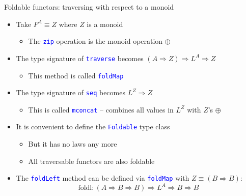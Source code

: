 \documentclass[english]{beamer}
\begin{document}
\begin{frame}{Foldable functors: traversing with respect to a monoid}
\begin{itemize}
\item \vspace{-0.15cm}Take $F^{A}\equiv Z$ where $Z$ is a monoid
\begin{itemize}
\item The \texttt{\textcolor{blue}{\footnotesize{}zip}} operation is the
monoid operation $\oplus$
\end{itemize}
\item The type signature of \texttt{\textcolor{blue}{\footnotesize{}traverse}}
becomes $\left(A\Rightarrow Z\right)\Rightarrow L^{A}\Rightarrow Z$
\begin{itemize}
\item This method is called \texttt{\textcolor{blue}{\footnotesize{}foldMap}} 
\end{itemize}
\item The type signature of \texttt{\textcolor{blue}{\footnotesize{}seq}}
becomes $L^{Z}\Rightarrow Z$
\begin{itemize}
\item This is called \texttt{\textcolor{blue}{\footnotesize{}mconcat}} --
combines all values in $L^{Z}$ with $Z$'s $\oplus$
\end{itemize}
\item It is convenient to define the \texttt{\textcolor{blue}{\footnotesize{}Foldable}}
type class
\begin{itemize}
\item But it has no laws any more
\item All traversable functors are also foldable
\end{itemize}
\item The \texttt{\textcolor{blue}{\footnotesize{}foldLeft}} method can
be defined via \texttt{\textcolor{blue}{\footnotesize{}foldMap}} with
$Z\equiv(B\Rightarrow B)$:
\[
\text{foldl}:\left(A\Rightarrow B\Rightarrow B\right)\Rightarrow L^{A}\Rightarrow B\Rightarrow B
\]
\end{itemize}
\end{frame}
\end{document}
